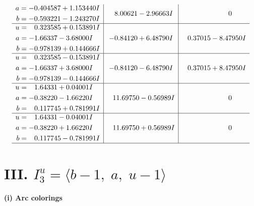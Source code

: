 \documentclass[1p]{elsarticle_modified}
\theoremstyle{definition}
\begin{document}
$$\begin{array}{c|c|c}
\begin{aligned}
a &= -0.404587 + 1.153440 I \\
b &= -0.593221 - 1.243270 I\end{aligned}
 & \phantom{-}8.00621 - 2.96663 I & \phantom{-0.000000 } 0 \\ \hline\begin{aligned}
u &= \phantom{-}0.323585 + 0.153891 I \\
a &= -1.66337 - 3.68000 I \\
b &= -0.978139 + 0.144666 I\end{aligned}
 & -0.84120 + 6.48790 I & \phantom{-}0.37015 - 8.47950 I \\ \hline\begin{aligned}
u &= \phantom{-}0.323585 - 0.153891 I \\
a &= -1.66337 + 3.68000 I \\
b &= -0.978139 - 0.144666 I\end{aligned}
 & -0.84120 - 6.48790 I & \phantom{-}0.37015 + 8.47950 I \\ \hline\begin{aligned}
u &= \phantom{-}1.64331 + 0.04001 I \\
a &= -0.38220 - 1.66220 I \\
b &= \phantom{-}0.117745 + 0.781991 I\end{aligned}
 & \phantom{-}11.69750 - 0.56989 I & \phantom{-0.000000 } 0 \\ \hline\begin{aligned}
u &= \phantom{-}1.64331 - 0.04001 I \\
a &= -0.38220 + 1.66220 I \\
b &= \phantom{-}0.117745 - 0.781991 I\end{aligned}
 & \phantom{-}11.69750 + 0.56989 I & \phantom{-0.000000 } 0\\
 \hline 
 \end{array}$$\newpage\newpage\renewcommand{\arraystretch}{1}
\centering \section*{III. $I^u_{3}= \langle b-1,\;a,\;u-1 \rangle$}
\flushleft \textbf{(i) Arc colorings}\\
\end{document}
